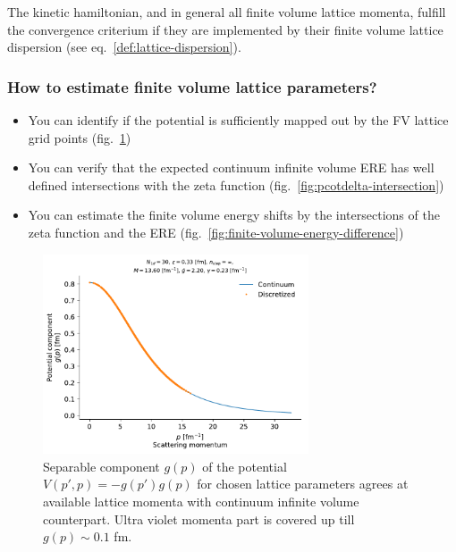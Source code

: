 \documentclass[
    aps,
    prl,
    showkeys,
    nofootinbib,
    floatfix
]{revtex4-1}
\begin{document}
The kinetic hamiltonian, and in general all finite volume lattice momenta, fulfill the convergence criterium if they are implemented by their finite volume lattice dispersion (see eq.~\eqref{def:lattice-dispersion}).

\subsubsection{How to estimate finite volume lattice parameters?}
\begin{itemize}
	\item You can identify if the potential is sufficiently mapped out by the FV lattice grid points (fig.~\ref{fig:potential-component})
	\item You can verify that the expected continuum infinite volume ERE has well defined intersections with the zeta function (fig.~\ref{fig:pcotdelta-intersection})
	\item You can estimate the finite volume energy shifts by the intersections of the zeta function and the ERE (fig.~\ref{fig:finite-volume-energy-difference})
\end{itemize}

\begin{figure}[!htb]
\includegraphics[width=0.7\textwidth]{figs/potential-component.pdf}
\caption{
	\label{fig:potential-component}
	Separable component $g(p)$ of the potential $V(p', p) = -g(p') g(p)$ for chosen lattice parameters agrees at available lattice momenta with continuum infinite volume counterpart.
	Ultra violet momenta part is covered up till $g(p) \sim 0.1$ fm.
}
\end{figure}
\end{document}
